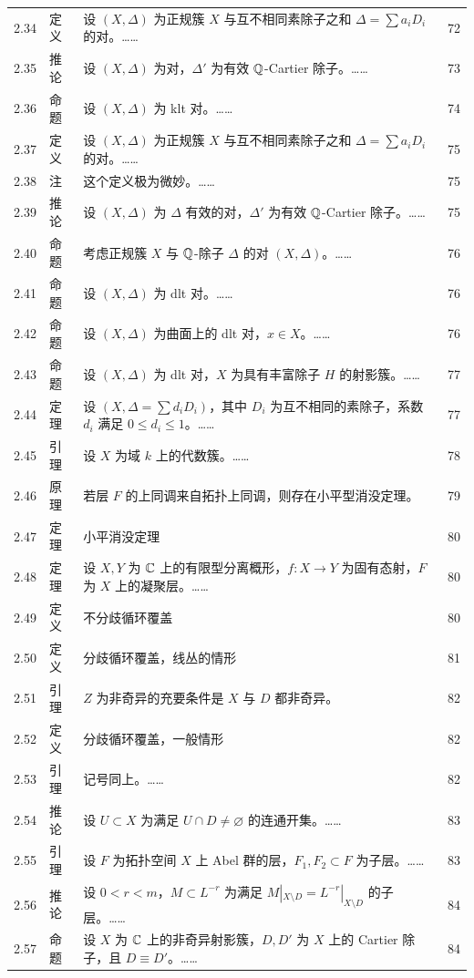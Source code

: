 \begin{longtable}{@{}p{}p{}p{}p{}@{}}
2.34 & 定义 & 设 $(X,\Delta)$ 为正规簇 $X$ 与互不相同素除子之和 $\Delta=\sum a_iD_i$ 的对。…… & 72 \\
2.35 & 推论 & 设 $(X,\Delta)$ 为对，$\Delta'$ 为有效 $\mathbb{Q}$-Cartier 除子。…… & 73 \\
2.36 & 命题 & 设 $(X,\Delta)$ 为 klt 对。…… & 74 \\
2.37 & 定义 & 设 $(X,\Delta)$ 为正规簇 $X$ 与互不相同素除子之和 $\Delta=\sum a_iD_i$ 的对。…… & 75 \\
2.38 & 注 & 这个定义极为微妙。…… & 75 \\
2.39 & 推论 & 设 $(X,\Delta)$ 为 $\Delta$ 有效的对，$\Delta'$ 为有效 $\mathbb{Q}$-Cartier 除子。…… & 75 \\
2.40 & 命题 & 考虑正规簇 $X$ 与 $\mathbb{Q}$-除子 $\Delta$ 的对 $(X,\Delta)$。…… & 76 \\
2.41 & 命题 & 设 $(X,\Delta)$ 为 dlt 对。…… & 76 \\
2.42 & 命题 & 设 $(X,\Delta)$ 为曲面上的 dlt 对，$x\in X$。…… & 76 \\
2.43 & 命题 & 设 $(X,\Delta)$ 为 dlt 对，$X$ 为具有丰富除子 $H$ 的射影簇。…… & 77 \\
2.44 & 定理 & 设 $(X,\Delta=\sum d_iD_i)$，其中 $D_i$ 为互不相同的素除子，系数 $d_i$ 满足 $0\le d_i\le 1$。…… & 77 \\
2.45 & 引理 & 设 $X$ 为域 $k$ 上的代数簇。…… & 78 \\
2.46 & 原理 & 若层 $F$ 的上同调来自拓扑上同调，则存在小平型消没定理。 & 79 \\
2.47 & 定理 & 小平消没定理 & 80 \\
2.48 & 定理 & 设 $X,Y$ 为 $\mathbb{C}$ 上的有限型分离概形，$f:X\to Y$ 为固有态射，$F$ 为 $X$ 上的凝聚层。…… & 80 \\
2.49 & 定义 & 不分歧循环覆盖 & 80 \\
2.50 & 定义 & 分歧循环覆盖，线丛的情形 & 81 \\
2.51 & 引理 & $Z$ 为非奇异的充要条件是 $X$ 与 $D$ 都非奇异。 & 82 \\
2.52 & 定义 & 分歧循环覆盖，一般情形 & 82 \\
2.53 & 引理 & 记号同上。…… & 82 \\
2.54 & 推论 & 设 $U\subset X$ 为满足 $U\cap D\ne\varnothing$ 的连通开集。…… & 83 \\
2.55 & 引理 & 设 $F$ 为拓扑空间 $X$ 上 Abel 群的层，$F_1,F_2\subset F$ 为子层。…… & 83 \\
2.56 & 推论 & 设 $0<r<m$，$M\subset L^{-r}$ 为满足 $M|_{X\setminus D}=L^{-r}|_{X\setminus D}$ 的子层。…… & 84 \\
2.57 & 命题 & 设 $X$ 为 $\mathbb{C}$ 上的非奇异射影簇，$D,D'$ 为 $X$ 上的 Cartier 除子，且 $D\equiv D'$。…… & 84 \\

\end{longtable}
